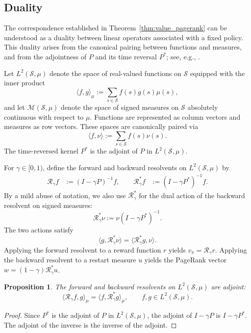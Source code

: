 \documentclass[letterpaper, 10 pt, conference]{ieeeconf}
\renewcommand{\S}{\mathcal{S}}
\newtheorem{proposition}{Proposition}
\begin{document}
\subsection{Duality}

The correspondence established in
Theorem~\ref{thm:value_pagerank} can be understood as a
duality between linear operators associated with a fixed
policy. This duality arises from the canonical pairing
between functions and measures, and from the adjointness
of $P$ and its time reversal $P^*$; see, e.g., \cite[Section~1.6]{levin2017markov}.

Let $L^2(\S,\mu)$ denote the space of real-valued
functions on $\S$ equipped with the inner product
\[
\langle f,g\rangle_\mu
:=\sum_{s\in\S}f(s)g(s)\mu(s),
\]
and let $\mathcal M(\S,\mu)$ denote the space of signed
measures on $\S$ absolutely continuous with respect to
$\mu$. Functions are represented as column vectors and
measures as row vectors. These spaces are canonically
paired via
\[
\langle f,\nu\rangle:=\sum_{s\in\S}f(s)\nu(s).
\]
The time-reversed kernel $P^*$ is
the adjoint of $P$ in $L^2(\S,\mu)$.

For $\gamma\in[0,1)$, define the forward and backward
resolvents on $L^2(\S,\mu)$ by
\[
\begin{aligned}
\mathcal R_\gamma f&:=(I-\gamma P)^{-1}f,\qquad
\mathcal R_\gamma^*f&:=(I-\gamma P^*)^{-1}f.
\end{aligned}
\]
By a mild abuse of notation, we also use
$\mathcal R_\gamma^*$ for the dual action of the
backward resolvent on signed measures:
\[
\mathcal R_\gamma^*\nu:=\nu(I-\gamma P^*)^{-1}.
\]
The two actions satisfy
\[
\langle g,\mathcal R_\gamma^*\nu\rangle
=
\langle\mathcal R_\gamma^*g,\nu\rangle.
\]
Applying the forward resolvent to a reward function $r$
yields $v_\pi=\mathcal R_\gamma r$. Applying the backward
resolvent to a restart measure $u$ yields the PageRank
vector $w=(1-\gamma)\mathcal R_\gamma^*u$.

\begin{proposition}
\label{prop:resolvent_adjointness}
The forward and backward resolvents on $L^2(\S,\mu)$
are adjoint:
\[
\langle\mathcal R_\gamma f,g\rangle_\mu
=
\langle f,\mathcal R_\gamma^*g\rangle_\mu,
\qquad f,g\in L^2(\S,\mu).
\]
\end{proposition}

\begin{proof}
Since $P^*$ is the adjoint of $P$ in $L^2(\S,\mu)$,
the adjoint of $I-\gamma P$ is $I-\gamma P^*$.
The adjoint of the inverse is the inverse of the adjoint.
\end{proof}
\end{document}
